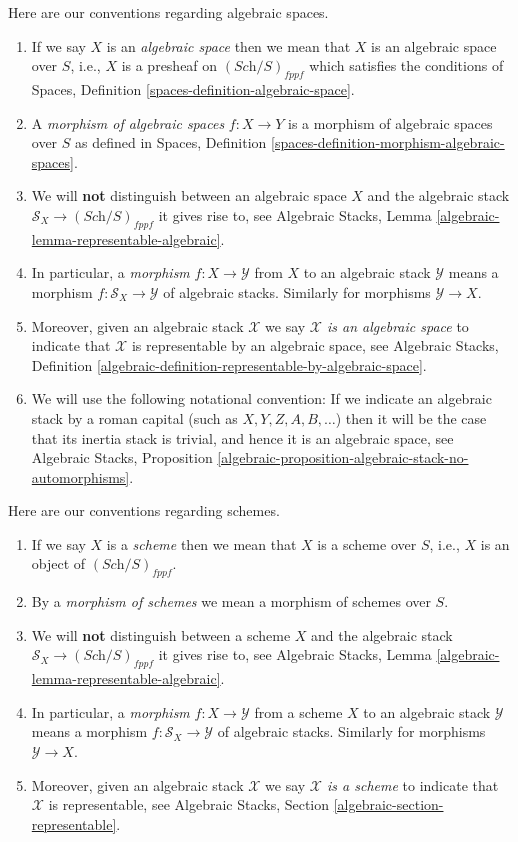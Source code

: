 \medskip\noindent
Here are our conventions regarding algebraic spaces.
\begin{enumerate}
\item If we say $X$ is an {\it algebraic space} then we mean that
$X$ is an algebraic space over $S$, i.e., $X$ is a presheaf on
$(\textit{Sch}/S)_{fppf}$ which satisfies the conditions of
Spaces, Definition \ref{spaces-definition-algebraic-space}.
\item A {\it morphism of algebraic spaces} $f :X \to Y$ is a morphism
of algebraic spaces over $S$ as defined in
Spaces, Definition \ref{spaces-definition-morphism-algebraic-spaces}.
\item We will {\bf not} distinguish between an algebraic space $X$
and the algebraic stack $\mathcal{S}_X \to (\textit{Sch}/S)_{fppf}$
it gives rise to, see
Algebraic Stacks, Lemma \ref{algebraic-lemma-representable-algebraic}.
\item In particular, a {\it morphism} $f : X \to \mathcal{Y}$ from $X$
to an algebraic stack $\mathcal{Y}$ means a morphism
$f : \mathcal{S}_X \to \mathcal{Y}$ of algebraic stacks.
Similarly for morphisms $\mathcal{Y} \to X$.
\item Moreover, given an algebraic stack $\mathcal{X}$ we say
{\it $\mathcal{X}$ is an algebraic space} to indicate that $\mathcal{X}$
is representable by an algebraic space, see
Algebraic Stacks,
Definition \ref{algebraic-definition-representable-by-algebraic-space}.
\item We will use the following notational convention: If we
indicate an algebraic stack by a roman capital
(such as $X, Y, Z, A, B, \ldots$) then it will be the case that
its inertia stack is trivial, and hence it is an algebraic space, see
Algebraic Stacks,
Proposition \ref{algebraic-proposition-algebraic-stack-no-automorphisms}.
\end{enumerate}

\medskip\noindent
Here are our conventions regarding schemes.
\begin{enumerate}
\item If we say $X$ is a {\it scheme} then we mean that
$X$ is a scheme over $S$, i.e., $X$ is an object of $(\textit{Sch}/S)_{fppf}$.
\item By a {\it morphism of schemes} we mean a morphism of schemes over $S$.
\item We will {\bf not} distinguish between a scheme $X$ and the
algebraic stack $\mathcal{S}_X \to (\textit{Sch}/S)_{fppf}$ it gives rise
to, see
Algebraic Stacks, Lemma \ref{algebraic-lemma-representable-algebraic}.
\item In particular, a {\it morphism} $f : X \to \mathcal{Y}$ from
a scheme $X$ to an algebraic stack $\mathcal{Y}$ means a morphism
$f : \mathcal{S}_X \to \mathcal{Y}$ of algebraic stacks.
Similarly for morphisms $\mathcal{Y} \to X$.
\item Moreover, given an algebraic stack $\mathcal{X}$ we say
{\it $\mathcal{X}$ is a scheme} to indicate that $\mathcal{X}$
is representable, see
Algebraic Stacks, Section \ref{algebraic-section-representable}.
\end{enumerate}

